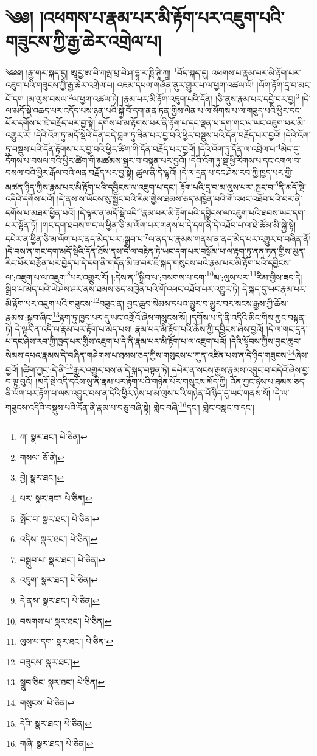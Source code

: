 \setcounter{footnote}{0} 
\chapter{༄༅། །འཕགས་པ་རྣམ་པར་མི་རྟོག་པར་འཇུག་པའི་གཟུངས་ཀྱི་རྒྱ་ཆེར་འགྲེལ་པ།}༄༅༅། །རྒྱ་གར་སྐད་དུ། ཨཱརྱ་ཨ་བི་ཀལྤ་པྲ་བེ་ཤ་དྷཱ་ར་ཎཱི་ཊཱི་ཀཱ། \footnote{ཀ་  སྣར་ཐང་།  པེ་ཅིན། }བོད་སྐད་དུ། འཕགས་པ་རྣམ་པར་མི་རྟོག་པར་འཇུག་པའི་གཟུངས་ཀྱི་རྒྱ་ཆེར་འགྲེལ་པ། འཇམ་དཔལ་གཞོན་ནུར་གྱུར་པ་ལ་ཕྱག་འཚལ་ལོ། །ལོག་རྟོག་དྲ་བ་མང་པོ་དག །མ་ལུས་བསལ་\footnote{གསལ་  ཅོ་ནེ། }ལ་ཕྱག་འཚལ་ཏེ། །རྣམ་པར་མི་རྟོག་འཇུག་པའི་དོན། །ཅི་ནུས་རྣམ་པར་དབྱེ་བར་བྱ།\footnote{བྱེ།  སྣར་ཐང་། } །དེ་ལ་མདོ་སྡེ་འཆད་པར་འདོད་པས་ཉན་པའི་སྐྱེ་བོ་དག་ནན་ཏན་གྱིས་ལེན་པ་ལ་སོགས་པ་ལ་གཟུད་པའི་ཕྱིར་དང་པོར་དགོས་པ་ཇེ་བརྗོད་པར་བྱ་སྟེ། དགོས་པ་མ་རྟོགས་པར་ནི་རྟོག་པ་དང་ལྡན་པ་དག་གང་ལ་ཡང་འཇུག་པར་མི་འགྱུར་རོ། །དེའི་འོག་ཏུ་མདོ་སྡེའི་དོན་བདེ་བླག་ཏུ་ཟིན་པར་བྱ་བའི་ཕྱིར་བསྡུས་པའི་དོན་བརྗོད་པར་བྱའོ། །དེའི་འོག་ཏུ་བསྡུས་པའི་དོན་རྟོགས་པར་བྱ་བའི་ཕྱིར་ཚིག་གི་དོན་བརྗོད་པར་བྱའོ། །དེའི་འོག་ཏུ་དོན་ལ་འབྲེལ་པ་\footnote{པར་  སྣར་ཐང་།  པེ་ཅིན། }མེད་དུ་དོགས་པ་བསལ་བའི་ཕྱིར་ཚིག་གི་མཚམས་སྦྱར་བ་བསྟན་པར་བྱའོ། །དེའི་འོག་ཏུ་སྔ་ཕྱི་རིགས་པ་དང་འགལ་བ་བསལ་བའི་ཕྱིར་རྒོལ་བའི་ལན་བརྗོད་པར་བྱ་སྟེ། ཚུལ་ནི་དེ་ལྟའོ། །དེ་ལ་དྲན་པ་དང་ཤེས་རབ་ཀྱི་ཁྱད་པར་གྱི་མཚན་ཉིད་ཀྱིས་རྣམ་པར་མི་རྟོག་པའི་དབྱིངས་ལ་འཇུག་པ་དང་། རྟོག་པའི་དྲ་བ་མ་ལུས་པར་:སྤང་བ་\footnote{སྤོང་བ་  སྣར་ཐང་།  པེ་ཅིན། }ནི་མདོ་སྡེ་འདིའི་དགོས་པའོ། །དེ་ནས་ས་ཡོངས་སུ་སྦྱོང་བའི་རིམ་གྱིས་ཐམས་ཅད་མཁྱེན་པའི་གོ་འཕང་འཐོབ་པའི་བར་ནི་དགོས་པ་མཐར་ཕྱིན་པའོ། །དེ་ལྟར་ན་མདོ་སྡེ་འདི་\footnote{འདིས་  སྣར་ཐང་།  པེ་ཅིན། }རྣམ་པར་མི་རྟོག་པའི་དབྱིངས་ལ་འཇུག་པའི་ཐབས་ཡང་དག་པར་སྟོན་ཏོ། །གང་དག་ཐབས་གང་ལ་ཕྱིན་ཅི་མ་ལོག་པར་གནས་པ་དེ་དག་ནི་དེ་འཐོབ་པ་ལ་ཐེ་ཚོམ་མི་སྐྱེ་སྟེ། དཔེར་ན་ཕྱིན་ཅི་མ་ལོག་པར་ནད་མེད་པར་:སྒྲུབ་པ་\footnote{བསྒྲུབ་པ་  སྣར་ཐང་།  པེ་ཅིན། }ལ་ནད་པ་རྣམས་གནས་ན་ནད་མེད་པར་འགྱུར་བ་བཞིན་ནོ། །དེ་བས་ན་གང་དག་མདོ་སྡེའི་དོན་ཐོས་ནས་དེ་ལ་བརྟེན་ཏེ་ཡང་དག་པར་བསྒོམ་པ་ལ་རྟག་ཏུ་ནན་ཏན་གྱིས་ཡུན་རིང་པོར་བརྩོན་པར་བྱེད་པ་དེ་དག་ནི་གདོན་མི་ཟ་བར་ཇི་སྐད་གསུངས་པའི་རྣམ་པར་མི་རྟོག་པའི་དབྱིངས་ལ་:འཇུག་པ་ལ་འཇུག་\footnote{འཇུག་  སྣར་ཐང་།  པེ་ཅིན། }པར་འགྱུར་རོ། །:དེས་ན་\footnote{དེ་ནས་  སྣར་ཐང་།  པེ་ཅིན། }སྒྲིབ་པ་:བསགས་པ་དག་\footnote{བསགས་པ་  སྣར་ཐང་།  པེ་ཅིན། }མ་:ལུས་པར་\footnote{ལུས་པ་དག་  སྣར་ཐང་།  པེ་ཅིན། }རིམ་གྱིས་ཟད་དེ། སྒྲིབ་པ་མེད་པའི་ཡེ་ཤེས་ཤར་ནས་ཐམས་ཅད་མཁྱེན་པའི་གོ་འཕང་འཐོབ་པར་འགྱུར་ཏེ། དེ་སྐད་དུ་ཡང་རྣམ་པར་མི་རྟོག་པར་འཇུག་པའི་གཟུངས་\footnote{བཟུངས་  སྣར་ཐང་། }བཟུང་ན། བྱང་ཆུབ་སེམས་དཔའ་མྱུར་བ་མྱུར་བར་སངས་རྒྱས་ཀྱི་ཆོས་རྣམས་:སྒྲུབ་ཞིང་\footnote{སྒྲུབ་ཅིང་  སྣར་ཐང་།  པེ་ཅིན། }རྟག་ཏུ་ཁྱད་པར་དུ་ཡང་འགྲོའོ་ཞེས་གསུངས་སོ། །དགོས་པ་དེ་ནི་འདིའི་མིང་གིས་ཀྱང་བསྟན་ཏེ། དེ་ལྟར་ན་འདི་ལ་རྣམ་པར་རྟོག་པ་མེད་པས། རྣམ་པར་མི་རྟོག་པའི་ཆོས་ཀྱི་དབྱིངས་ཞེས་བྱའོ། །དེ་ལ་གང་དྲན་པ་དང་ཤེས་རབ་ཀྱི་ཁྱད་པར་གྱིས་འཇུག་པ་དེ་ནི་རྣམ་པར་མི་རྟོག་པ་ལ་འཇུག་པའོ། །དེའི་སྟོབས་ཀྱིས་བྱང་ཆུབ་སེམས་དཔའ་རྣམས་དེ་བཞིན་གཤེགས་པ་ཐམས་ཅད་ཀྱིས་གསུངས་པ་ཀུན་འཛིན་པས་ན་དེ་ཉིད་གཟུངས་\footnote{གསུངས་  པེ་ཅིན། }ཞེས་བྱའོ། །ཚིག་ཀྱང་:དེ་ནི་\footnote{དེའི་  སྣར་ཐང་།  པེ་ཅིན། }རྒྱུར་འགྱུར་བས་ན་དེ་སྐད་བསྟན་ཏེ། དཔེར་ན་སངས་རྒྱས་རྣམས་འབྱུང་བ་བདེའོ་ཞེས་བྱ་བ་ལྟ་བུའོ། །མདོ་སྡེ་འདི་དངོས་སུ་ནི་རྣམ་པར་རྟོག་པའི་གཉེན་པོར་གསུངས་མོད་ཀྱི། འོན་ཀྱང་ཉེས་པ་ཐམས་ཅད་ནི་ལོག་པར་རྟོག་པ་ལས་འབྱུང་བས་ན་དེའི་ཕྱིར་ཉེས་པ་མ་ལུས་པའི་གཉེན་པོ་ཉིད་དུ་ཡང་གནས་སོ། །དེ་ལ་གཟུངས་འདིའི་བསྡུས་པའི་དོན་ནི་རྣམ་པ་བཅུ་བཞི་སྟེ། གླེང་བཞི་\footnote{གཞི་  སྣར་ཐང་།  པེ་ཅིན། }དང་། གླེང་བསླང་བ་དང་། 